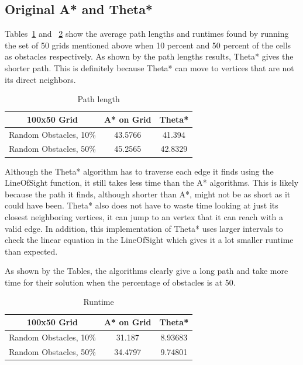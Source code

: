 \documentclass[a4paper,11pt]{report}
\begin{document}
\subsection{Original A* and Theta*}
Tables~\ref{table:original_path_lengths} and ~\ref{table:original_runtimes} show the average path lengths and runtimes found by running the set of 50 grids mentioned above when 10 percent and 50 percent of the cells as obstacles respectively. As shown by the path lengths results, Theta* gives the shorter path. This is definitely because Theta* can move to vertices that are not its direct neighbors.

\begin{table}[h!]
   \centering
   \begin{tabular}{ | c | c | c | }

      \hline
      \textbf{100x50 Grid} & \textbf{A* on Grid} & \textbf{Theta*}  \\ \hline
      Random Obstacles, 10\% & 43.5766 & 41.394  \\ \hline
      Random Obstacles, 50\% & 45.2565 & 42.8329  \\ \hline
   \end{tabular}

   \caption{Path length}
   \label{table:original_path_lengths}
\end{table}

Although the Theta* algorithm has to traverse each edge it finds using the LineOfSight function, it still takes less time than the A* algorithms. This is likely because the path it finds, although shorter than A*, might not be as short as it could have been. Theta* also does not have to waste time looking at just its closest neighboring vertices, it can jump to an vertex that it can reach with a valid edge. In addition, this implementation of Theta* uses larger intervals to check the linear equation in the LineOfSight which gives it a lot smaller runtime than expected.

As shown by the Tables, the algorithms clearly give a long path and take more time for their solution when the percentage of obstacles is at 50.

\begin{table}[h!]
   \centering
   \begin{tabular}{ | c | c |c | }

      \hline
      \textbf{100x50 Grid} & \textbf{A* on Grid} & \textbf{Theta*}   \\ \hline
      Random Obstacles, 10\% & 31.187 & 8.93683  \\ \hline
      Random Obstacles, 50\% & 34.4797 & 9.74801  \\ \hline

   \end{tabular}

   \caption{Runtime}
   \label{table:original_runtimes}
\end{table}
\end{document}
